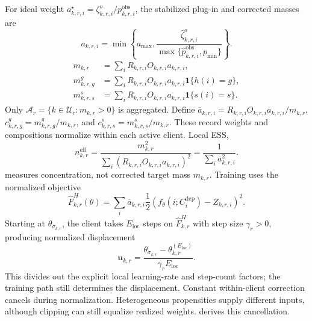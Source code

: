 \documentclass[letterpaper,journal]{IEEEtran}
\begin{document}
For ideal weight $a^\star_{k,r,i}=\zeta^o_{k,r,i}/p^{\mathrm{obs}}_{k,r,i}$,
the stabilized plug-in and corrected masses are
\begin{equation}
 a_{k,r,i}
 =
 \min\!\left\{
 a_{\max},
 \frac{\widehat\zeta^{o}_{k,r,i}}
 {\max\{\widehat p^{\mathrm{obs}}_{k,r,i},p_{\min}\}}
 \right\}.
 \label{eq:a_stabilized}
\end{equation}
\begin{align}
m_{k,r}
    &=
    \sum_i
    R_{k,r,i}O_{k,r,i}a_{k,r,i},
    \label{eq:m_total}\\
m^{g}_{k,r,g}
 &=
 \sum_i
 R_{k,r,i}O_{k,r,i}a_{k,r,i}
 \mathbf{1}\{h(i)=g\},
 \label{eq:m_group}\\
m^{s}_{k,r,s}
 &=
 \sum_i
 R_{k,r,i}O_{k,r,i}a_{k,r,i}
 \mathbf{1}\{s(i)=s\}.
 \label{eq:m_stratum}
\end{align}
Only $\mathcal A_r=\{k\in\mathcal U_r:m_{k,r}>0\}$ is aggregated.  Define
$\overline a_{k,r,i}=R_{k,r,i}O_{k,r,i}a_{k,r,i}/m_{k,r}$,
$c^g_{k,r,g}=m^g_{k,r,g}/m_{k,r}$, and
$c^s_{k,r,s}=m^s_{k,r,s}/m_{k,r}$.  These record weights and compositions
normalize within each active client.  Local ESS,
\begin{equation}
 n^{\mathrm{eff}}_{k,r}
 =
 \frac{m_{k,r}^2}
 {\sum_i
  (R_{k,r,i}O_{k,r,i}a_{k,r,i})^2}
 =
 \frac{1}{\sum_i\overline a_{k,r,i}^2}.
 \label{eq:neff}
\end{equation}
measures concentration, not corrected target mass $m_{k,r}$.
Training uses the normalized objective
\begin{equation}
 \widehat F^{H}_{k,r}(\theta)
 =
 \sum_i
 \overline a_{k,r,i}
 \frac{1}{2}
 \left(
 f_{\theta}(i;C_i^{\mathrm{dep}})
 -
 Z_{k,r,i}
 \right)^2.
 \label{eq:local_hajek_objective}
\end{equation}
Starting at $\theta_{\sigma_{k,r}}$, the client takes $E_{\mathrm{loc}}$ steps
on $\widehat F^H_{k,r}$ with step size $\gamma_r>0$, producing normalized
displacement
\begin{equation}
 \mathbf{u}_{k,r}
 =
 \frac{
 \theta_{\sigma_{k,r}}
 -
 \theta^{(E_{\mathrm{loc}})}_{k,r}
 }{\gamma_r E_{\mathrm{loc}}}.
 \label{eq:normalized_update}
\end{equation}
This divides out the explicit local learning-rate and step-count factors;
the training path still determines the displacement.  Constant within-client correction cancels during
normalization.  Heterogeneous propensities supply different inputs, although
clipping can still equalize realized weights.
 derives this cancellation.
\end{document}
